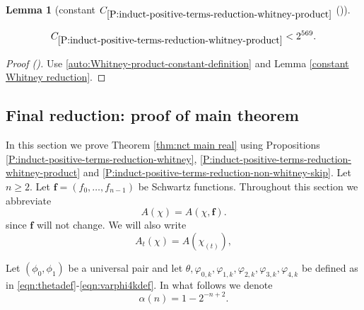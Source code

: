 \documentclass[12pt,reqno]{amsart}
\newcommand{\auto}{{({\tiny\faCar})}}
\theoremstyle{plain}
\newtheorem{lemma}[theorem]{Lemma}
\numberwithin{equation}{section}
\theoremstyle{remark}
\newcommand{\uses}[1]{}
\newcommand{\usesdefs}[1]{}
\newcommand{\leanok}{}
\newcommand{\lean}[1]{}
\begin{document}
\begin{lemma}[constant $C_{\ref{P:induct-positive-terms-reduction-whitney-product}}$ \auto]\label{constant Whitney product reduction}\uses{constant Whitney reduction,P:induct-positive-terms-reduction-whitney-product}\usesdefs{}
\lean{Auto.constantWhitneyProductReduction}
\leanok
\begin{equation}\label{constant Whitney product reduction bound}
C_{\ref{P:induct-positive-terms-reduction-whitney-product}}
<2^{569}.
\end{equation}
\end{lemma}
\begin{proof}[Proof \auto]
Use \eqref{auto:Whitney-product-constant-definition} and Lemma \ref{constant Whitney reduction}.
\end{proof}


\subsection{Final reduction: proof of main theorem}\label{sec:pfmainthm}
In this section we prove Theorem \ref{thm:nct main real} using Propositions \ref{P:induct-positive-terms-reduction-whitney}, \ref{P:induct-positive-terms-reduction-whitney-product} and \ref{P:induct-positive-terms-reduction-non-whitney-skip}.
Let $n\ge 2$.
Let $\mathbf{f}=(f_0,\dots,f_{n-1})$ be Schwartz functions.
Throughout this section we abbreviate
\begin{equation}\label{abbreviated twisted average}
A(\chi)=A(\chi,\mathbf f).
\end{equation}
since $\mathbf{f}$ will not change.
We will also write
\begin{equation}
    \label{avg_rescale}
    A_t(\chi) = A(\chi_{(t)}),
\end{equation}


Let $(\phi_0, \phi_1)$ be a universal pair
and let $\theta, \varphi_{0,k}, \varphi_{1,k}, \varphi_{2,k}, \varphi_{3,k}, \varphi_{4,k}$ be defined as in \eqref{eqn:thetadef}-\eqref{eqn:varphi4kdef}. 
In what follows we denote
\begin{equation}\label{variation exponent alpha}
\alpha(n)=1-2^{-n+2}.
\end{equation}
\end{document}

